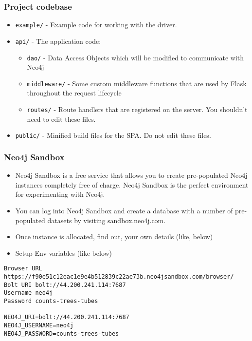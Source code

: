 \begin{frame}[fragile]\frametitle{Project codebase}
\begin{itemize}
\item \lstinline|example/| - Example code for working with the driver.
\item \lstinline|api/| - The application code:
	\begin{itemize}
	\item \lstinline|dao/| - Data Access Objects which will be modified to communicate with Neo4j
	\item \lstinline|middleware/| - Some custom middleware functions that are used by Flask throughout the request lifecycle
	\item \lstinline|routes/| - Route handlers that are registered on the server. You shouldn’t need to edit these files.
	\end{itemize}
\item \lstinline|public/| - Minified build files for the SPA. Do not edit these files.
\end{itemize}

\end{frame}

\begin{frame}[fragile]\frametitle{Neo4j Sandbox}
\begin{itemize}
\item Neo4j Sandbox is a free service that allows you to create pre-populated Neo4j instances completely free of charge. Neo4j Sandbox is the perfect environment for experimenting with Neo4j.
\item You can log into Neo4j Sandbox and create a database with a number of pre-populated datasets by visiting sandbox.neo4j.com.
\item Once instance is allocated, find out, your own details (like, below)
\item Setup Env variables (like below)
\end{itemize}

\begin{lstlisting}
Browser URL https://f90e51c12eac1e9e4b512839c22ae73b.neo4jsandbox.com/browser/
Bolt URI bolt://44.200.241.114:7687
Username neo4j
Password counts-trees-tubes

NEO4J_URI=bolt://44.200.241.114:7687
NEO4J_USERNAME=neo4j
NEO4J_PASSWORD=counts-trees-tubes
\end{lstlisting}

\end{frame}

